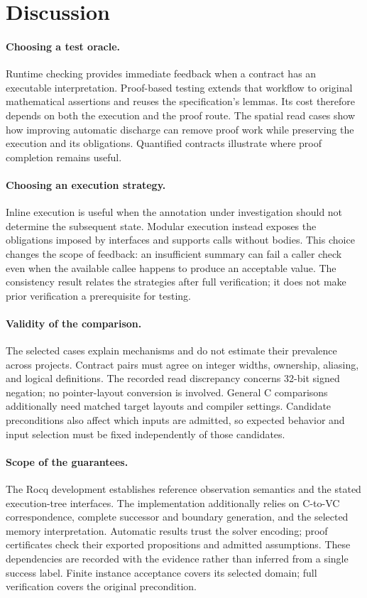 \section{Discussion}
\label{sec:discussion}
\paragraph{Choosing a test oracle.}
Runtime checking provides immediate feedback when a contract has an executable
interpretation. Proof-based testing extends that workflow to original
mathematical assertions and reuses the specification's lemmas. Its cost
therefore depends on both the execution and the proof route. The spatial read
cases show how improving automatic discharge can remove proof work while
preserving the execution and its obligations. Quantified contracts illustrate
where proof completion remains useful.

\paragraph{Choosing an execution strategy.}
Inline execution is useful when the annotation under investigation should
not determine the subsequent state. Modular execution instead exposes the
obligations imposed by interfaces and supports calls without bodies.
This choice changes the scope of feedback: an insufficient summary can fail
a caller check even when the available callee happens to produce an acceptable
value. The consistency result relates the strategies after full verification;
it does not make prior verification a prerequisite for testing.

\paragraph{Validity of the comparison.}
The selected cases explain mechanisms and do not estimate their prevalence
across projects. Contract pairs must agree on integer widths, ownership,
aliasing, and logical definitions. The recorded read discrepancy concerns
32-bit signed negation; no pointer-layout conversion is involved. General
C comparisons additionally need matched target layouts and compiler settings.
Candidate preconditions also affect which inputs are admitted, so expected
behavior and input selection must be fixed independently of those candidates.

\paragraph{Scope of the guarantees.}
The Rocq development establishes reference observation semantics and the
stated execution-tree interfaces. The implementation additionally relies on
C-to-VC correspondence, complete successor and boundary generation, and the
selected memory interpretation. Automatic results trust the solver encoding;
proof certificates check their exported propositions and admitted assumptions.
These dependencies are recorded with the evidence rather than inferred from
a single success label. Finite instance acceptance covers its selected domain;
full verification covers the original precondition.
